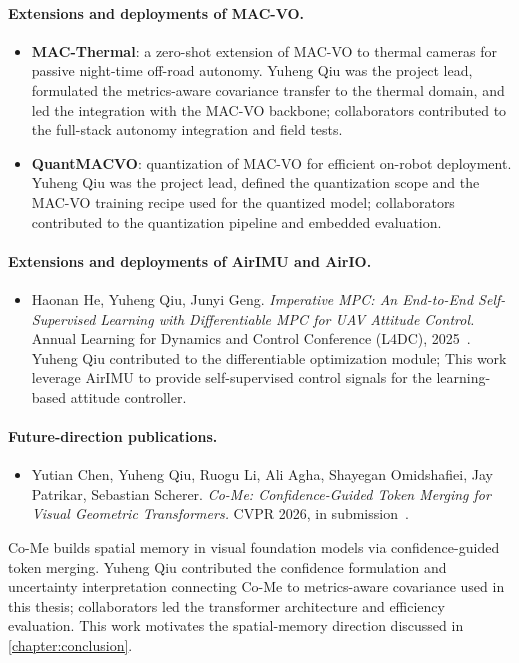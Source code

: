 \paragraph{Extensions and deployments of MAC-VO.}
\begin{itemize}
    \item \textbf{MAC-Thermal}: a zero-shot extension of MAC-VO to thermal cameras for passive night-time off-road autonomy.
    Yuheng Qiu was the project lead, formulated the metrics-aware covariance transfer to the thermal domain, and led the integration with the MAC-VO backbone; collaborators contributed to the full-stack autonomy integration and field tests.
    \item \textbf{QuantMACVO}: quantization of MAC-VO for efficient on-robot deployment.
    Yuheng Qiu was the project lead, defined the quantization scope and the MAC-VO training recipe used for the quantized model; collaborators contributed to the quantization pipeline and embedded evaluation.
\end{itemize}

\paragraph{Extensions and deployments of AirIMU and AirIO.}
\begin{itemize}
    \item Haonan He, Yuheng Qiu, Junyi Geng. \emph{Imperative MPC: An End-to-End Self-Supervised Learning with Differentiable MPC for UAV Attitude Control.} Annual Learning for Dynamics and Control Conference (L4DC), 2025~\cite{he2025imperative}.
    Yuheng Qiu contributed to the differentiable optimization module; This work leverage AirIMU to provide self-supervised control signals for the learning-based attitude controller.
\end{itemize}

\paragraph{Future-direction publications.}
\begin{itemize}
    \item Yutian Chen, Yuheng Qiu, Ruogu Li, Ali Agha, Shayegan Omidshafiei, Jay Patrikar, Sebastian Scherer. \emph{Co-Me: Confidence-Guided Token Merging for Visual Geometric Transformers.} CVPR 2026, in submission~\cite{chen2025come}.
\end{itemize}
Co-Me builds spatial memory in visual foundation models via confidence-guided token merging.
Yuheng Qiu contributed the confidence formulation and uncertainty interpretation connecting Co-Me to metrics-aware covariance used in this thesis; collaborators led the transformer architecture and efficiency evaluation.
This work motivates the spatial-memory direction discussed in \cref{chapter:conclusion}.

